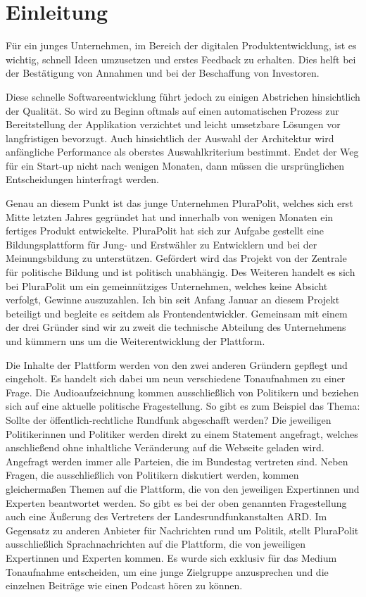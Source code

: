 \section{Einleitung}

Für ein junges Unternehmen, im Bereich der digitalen Produktentwicklung, ist es wichtig, schnell Ideen umzusetzen und erstes Feedback zu erhalten. Dies helft bei der Bestätigung von Annahmen und bei der Beschaffung von Investoren.

Diese schnelle Softwareentwicklung führt jedoch zu einigen Abstrichen hinsichtlich der Qualität. So wird zu Beginn oftmals auf einen automatischen Prozess zur Bereitstellung der Applikation verzichtet und leicht umsetzbare Lösungen vor langfristigen bevorzugt. Auch hinsichtlich der Auswahl der Architektur wird anfängliche Performance als oberstes Auswahlkriterium bestimmt. Endet der Weg für ein Start-up nicht nach wenigen Monaten, dann müssen die ursprünglichen Entscheidungen hinterfragt werden.

Genau an diesem Punkt ist das junge Unternehmen PluraPolit, welches sich erst Mitte letzten Jahres gegründet hat und innerhalb von wenigen Monaten ein fertiges Produkt entwickelte. PluraPolit hat sich zur Aufgabe gestellt eine Bildungsplattform für Jung- und Erstwähler zu Entwicklern und bei der Meinungsbildung zu unterstützen. Gefördert wird das Projekt von der Zentrale für politische Bildung und ist politisch unabhängig. Des Weiteren handelt es sich bei PluraPolit um ein gemeinnütziges Unternehmen, welches keine Absicht verfolgt, Gewinne auszuzahlen. Ich bin seit Anfang Januar an diesem Projekt beteiligt und begleite es seitdem als Frontendentwickler. Gemeinsam mit einem der drei Gründer sind wir zu zweit die technische Abteilung des Unternehmens und kümmern uns um die Weiterentwicklung der Plattform.

Die Inhalte der Plattform werden von den zwei anderen Gründern gepflegt und eingeholt. Es handelt sich dabei um neun verschiedene Tonaufnahmen zu einer Frage. Die Audioaufzeichnung kommen ausschließlich von Politikern und beziehen sich auf eine aktuelle politische Fragestellung. So gibt es zum Beispiel das Thema: Sollte der öffentlich-rechtliche Rundfunk abgeschafft werden? Die jeweiligen Politikerinnen und Politiker werden direkt zu einem Statement angefragt, welches anschließend ohne inhaltliche Veränderung auf die Webseite geladen wird. Angefragt werden immer alle Parteien, die im Bundestag vertreten sind. Neben Fragen, die ausschließlich von Politikern diskutiert werden, kommen gleichermaßen Themen auf die Plattform, die von den jeweiligen Expertinnen und Experten beantwortet werden. So gibt es bei der oben genannten Fragestellung auch eine Äußerung des Vertreters der Landesrundfunkanstalten ARD. Im Gegensatz zu anderen Anbieter für Nachrichten rund um Politik, stellt PluraPolit ausschließlich Sprachnachrichten auf die Plattform, die von jeweiligen Expertinnen und Experten kommen. Es wurde sich exklusiv für das Medium Tonaufnahme entscheiden, um eine junge Zielgruppe anzusprechen und die einzelnen Beiträge wie einen Podcast hören zu können.

